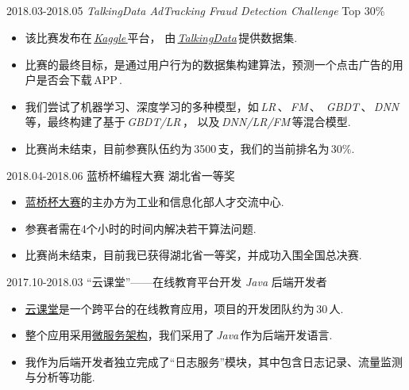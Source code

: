 \documentclass[letterpaper,AutoFakeBold]{twentysecondcv} %
\begin{document}
\begin{CJK*}{UTF8}{gbsn}
\newpage %
\makeprofile %

\begin{CJK*}{UTF8}{gkai}
\section{}
\end{CJK*}

2018.03-2018.05 \quad \emph{TalkingData AdTracking Fraud Detection Challenge} \hfill Top 30\%
\begin{itemize}
	\setlength{\itemsep}{0pt}
	\setlength{\parsep}{0pt}
	\setlength{\parskip}{0pt}
	\item 该比赛发布在\,\href{https://www.kaggle.com/c/talkingdata-adtracking-fraud-detection#description}{\emph{Kaggle}\,}平台，
	由\,\href{https://www.talkingdata.com/}{\emph{TalkingData}}\,提供数据集.
	\item 比赛的最终目标，是通过用户行为的数据集构建算法，预测一个点击广告的用户是否会下载\,APP\,.
	\item 我们尝试了机器学习、深度学习的多种模型，如\,\emph{LR}\,、\,\emph{FM}\,、
	\,\emph{GBDT}\,、\,\emph{DNN}\,等，最终构建了基于\,\emph{GBDT/LR}\,，
	以及\,\emph{DNN/LR/FM}\,等混合模型.
	\item 比赛尚未结束，目前参赛队伍约为\,3500\,支，我们的当前排名为\,30\%.
\end{itemize}

2018.04-2018.06 \qquad  蓝桥杯编程大赛 \hfill 湖北省一等奖
\begin{itemize}
	\setlength{\itemsep}{0pt}
	\setlength{\parsep}{0pt}
	\setlength{\parskip}{0pt}
	\item \href{http://dasai.lanqiao.cn/}{蓝桥杯大赛}的主办方为工业和信息化部人才交流中心.
	\item 参赛者需在4个小时的时间内解决若干算法问题.
	\item 比赛尚未结束，目前我已获得湖北省一等奖，并成功入围全国总决赛.
\end{itemize}

2017.10-2018.03 \qquad “云课堂”——在线教育平台开发 \hfill \emph{Java} 后端开发者
\begin{itemize}
	\setlength{\itemsep}{0pt}
	\setlength{\parsep}{0pt}
	\setlength{\parskip}{0pt}
	\item \href{https://www.dxtwangxiao.com/#/overview}{云课堂}是一个跨平台的在线教育应用，项目的开发团队约为\,30\,人.
	\item 整个应用采用\href{https://en.wikipedia.org/wiki/Microservices}{微服务架构}，我们采用了\,\emph{Java}\,作为后端开发语言.
	\item 我作为后端开发者独立完成了“日志服务”模块，其中包含日志记录、流量监测与分析等功能.
\end{itemize}


\end{CJK*}
\end{document}
